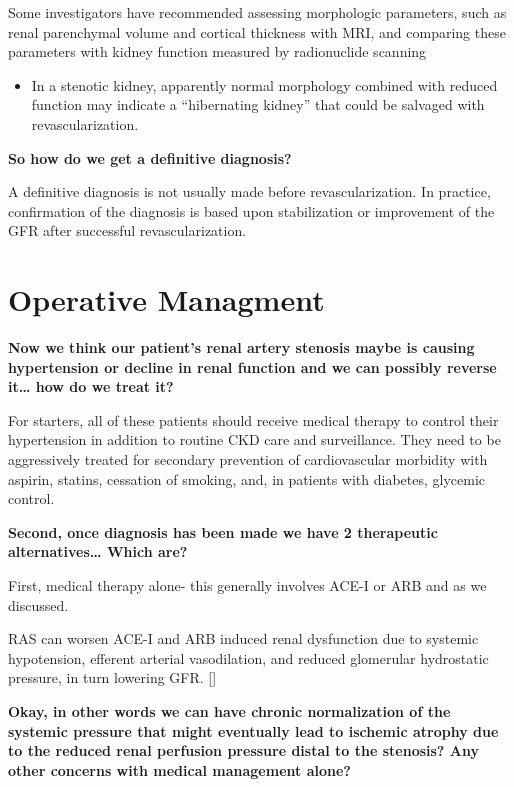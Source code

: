 \documentclass[
]{book}
\providecommand{\tightlist}{%
  \setlength{\itemsep}{0pt}\setlength{\parskip}{0pt}}
\begin{document}
Some investigators have recommended assessing morphologic parameters,
such as renal parenchymal volume and cortical thickness with MRI, and
comparing these parameters with kidney function measured by radionuclide
scanning

\begin{itemize}
\tightlist
\item
  In a stenotic kidney, apparently normal morphology combined with
  reduced function may indicate a ``hibernating kidney'' that could be
  salvaged with revascularization.
\end{itemize}

\textbf{So how do we get a definitive diagnosis?}

A definitive diagnosis is not usually made before revascularization. In
practice, confirmation of the diagnosis is based upon stabilization or
improvement of the GFR after successful revascularization.

\hypertarget{operative-managment}{%
\section{Operative Managment}\label{operative-managment}}

\textbf{Now we think our patient's renal artery stenosis maybe is causing
hypertension or decline in renal function and we can possibly reverse
it\ldots{} how do we treat it?}

For starters, all of these patients should receive medical therapy to
control their hypertension in addition to routine CKD care and
surveillance. They need to be aggressively treated for secondary
prevention of cardiovascular morbidity with aspirin, statins, cessation
of smoking, and, in patients with diabetes, glycemic control.

\textbf{Second, once diagnosis has been made we have 2 therapeutic
alternatives\ldots{} Which are?}

First, medical therapy alone- this generally involves ACE-I or ARB and
as we discussed.

RAS can worsen ACE-I and ARB induced renal dysfunction due to systemic
hypotension, efferent arterial vasodilation, and reduced glomerular
hydrostatic pressure, in turn lowering GFR.
{[}\citep{rickey125RenovascularDisease2019, schoolwerthRenalConsiderationsAngiotensin2001}{]}

\textbf{Okay, in other words we can have chronic normalization of the systemic
pressure that might eventually lead to ischemic atrophy due to the
reduced renal perfusion pressure distal to the stenosis? Any other
concerns with medical management alone?}
\end{document}
